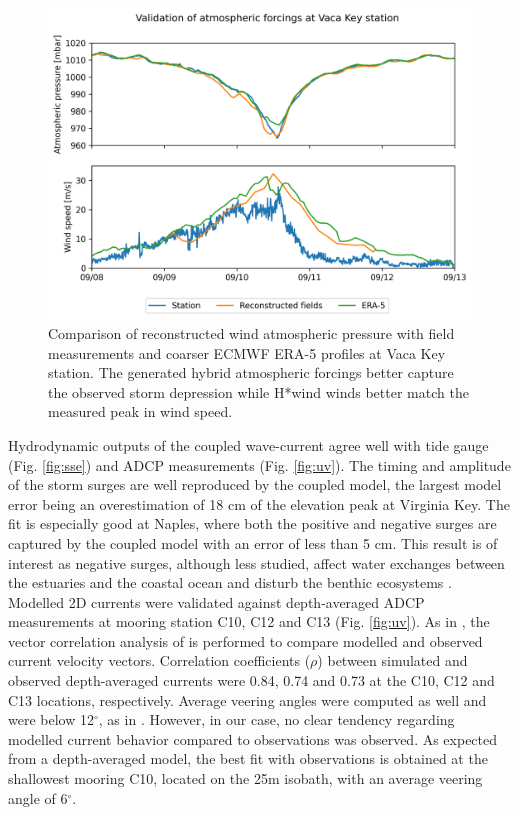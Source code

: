 \documentclass[11pt,a4paper]{article}
\begin{document}
\begin{figure}
    \centering
    \includegraphics[width=.95\textwidth]{fig/validation_met_2.png}
    \caption{Comparison of reconstructed wind atmospheric pressure with field measurements and coarser ECMWF ERA-5 profiles at Vaca Key station. The generated hybrid atmospheric forcings better capture the observed storm depression while H*wind winds better match the measured peak in wind speed.}
    \label{fig:forcings}
\end{figure}

Hydrodynamic outputs of the coupled wave-current agree well with tide gauge (Fig. \ref{fig:sse}) and ADCP measurements (Fig. \ref{fig:uv}). The timing and amplitude of the storm surges are well reproduced by the coupled model, the largest model error being an overestimation of 18 cm of the elevation peak at Virginia Key. The fit is especially good at Naples, where both the positive and negative surges are captured by the coupled model with an error of less than 5 cm. This result is of interest as negative surges, although less studied, affect water exchanges between the estuaries and the coastal ocean and disturb the benthic ecosystems \citep{liu2020impacts}. Modelled 2D currents were validated against depth-averaged ADCP measurements at mooring station C10, C12 and C13 (Fig. \ref{fig:uv}). As in \cite{liu2020impacts}, the vector correlation analysis of \cite{kundu1976ekman} is performed to compare modelled and observed current velocity vectors. Correlation coefficients ($\rho$) between simulated and observed depth-averaged currents were 0.84, 0.74 and 0.73 at the C10, C12 and C13 locations, respectively. Average veering angles were computed as well and were below 12$^\circ$, as in \citep{liu2020impacts}. However, in our case, no clear tendency regarding modelled current behavior compared to observations was observed. As expected from a depth-averaged model, the best fit with observations is obtained at the shallowest mooring C10, located on the 25m isobath, with an average veering angle of 6$^\circ$. 
\end{document}
